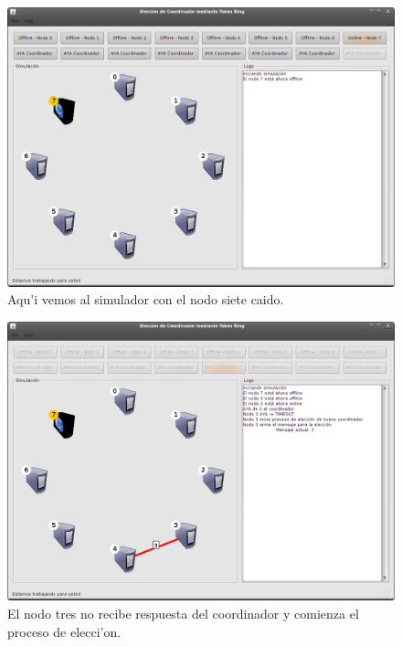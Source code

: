 \begin{figure}
\centering
 \includegraphics[scale=0.4,keepaspectratio=true]{./imagenes/tokenRing/token1.png}
 \caption{Aqu'i vemos al simulador con el nodo siete caido.}
\end{figure}

\begin{figure}
\centering
 \includegraphics[scale=0.4,keepaspectratio=true]{./imagenes/tokenRing/token2.png}
 \caption{El nodo tres no recibe respuesta del coordinador y comienza el proceso de elecci'on.}
\end{figure}

